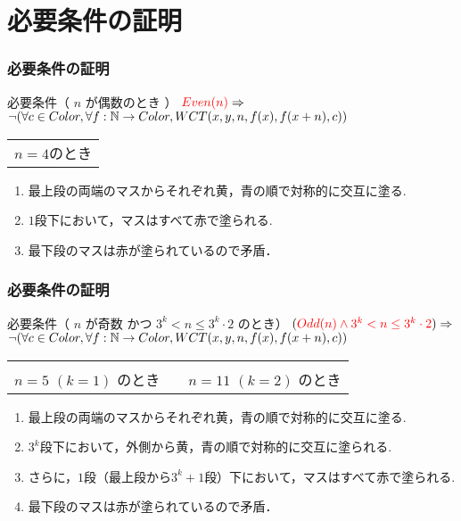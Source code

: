 \documentclass[dvipdfmx,cjk]{beamer}
\newcommand{\redt}[1]{\textcolor{red}{#1}}
\begin{document}
\section{必要条件の証明}

\begin{frame}
  \frametitle{必要条件の証明}
  \begin{block}{必要条件（ $n$ が偶数のとき ）}
    $\redt{Even(n)} \Imp$ \\
    $\lnot (\forall c \in Color, \forall f : \mathbb{N} \to Color, WCT(x,y,n,f(x),f(x+n),c))$
  \end{block}
  {\small
    \vfill
    \begin{center}
      \begin{tabular}{c}
        
        \\
        $n=4$のとき
      \end{tabular}
    \end{center}
    \begin{enumerate}
    \item
      最上段の両端のマスからそれぞれ黄，青の順で対称的に交互に塗る.
    \item
      $1$段下において，マスはすべて赤で塗られる.
    \item
      最下段のマスは赤が塗られているので矛盾．
    \end{enumerate}
  } 
\end{frame}

\begin{frame}
  \frametitle{必要条件の証明}
  \begin{block}{必要条件（ $n$ が奇数 かつ $3^k < n \leq 3^k \cdot 2$ のとき）}
    $(\redt{Odd(n) \land 3^k < n \leq 3^k \cdot 2}) \Imp$ \\
    $ \lnot (\forall c \in Color, \forall f : \mathbb{N} \to Color, WCT(x,y,n,f(x),f(x+n),c))$
  \end{block}
  {\footnotesize
    \vfill
    \begin{center}
      \begin{tabular}{ccc}
        
        &
        \hfill
        &
        
        \\
        $n=5$ $(k=1)$ のとき
        &
        \hfill
        &
        $n=11$ $(k=2)$ のとき
      \end{tabular}
    \end{center}
    \begin{enumerate}
    \item
      最上段の両端のマスからそれぞれ黄，青の順で対称的に交互に塗る.
    \item
      $3^k$段下において，外側から黄，青の順で対称的に交互に塗られる.
    \item
      さらに，$1$段（最上段から$3^k + 1$段）下において，マスはすべて赤で塗られる.
    \item
      最下段のマスは赤が塗られているので矛盾．
    \end{enumerate}
  } 
\end{frame}
\end{document}
